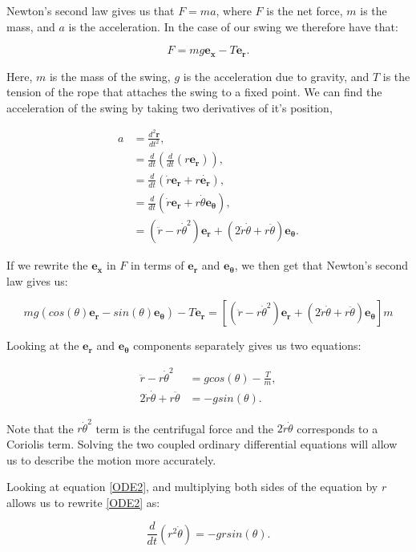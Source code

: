 \documentclass[12pt]{article}
\begin{document}
Newton's second law gives us that $F = ma$, where $F$ is the net force, $m$ is the mass, and $a$ is the acceleration. In the case of our swing we therefore have that:

$$F = m g \mathbf{e_x} - T \mathbf{e_r}.$$

Here, $m$ is the mass of the swing, $g$ is the acceleration due to gravity, and $T$ is the tension of the rope that attaches the swing to a fixed point. We can find the acceleration of the swing by taking two derivatives of it's position,

\begin{align}
    a &= \frac{d^2\mathbf{r}}{dt^2},\\
    &= \frac{d}{dt}(\frac{d}{dt}(r\mathbf{e_r})),\\
    &= \frac{d}{dt}(\dot{r} \mathbf{e_r} + r\mathbf{\dot{e_r}}),\\
    &= \frac{d}{dt}(\dot{r} \mathbf{e_r} + r\dot{\theta}\mathbf{e_\theta}),\\
    &= (\ddot{r} - r \dot{\theta}^2) \mathbf{e_r} + (2\dot{r} \dot{\theta} + r \ddot{\theta}) \mathbf{e_\theta}.
\end{align}

If we rewrite the $\mathbf{e_x}$ in $F$ in terms of $\mathbf{e_r}$ and $\mathbf{e_\theta}$, we then get that Newton's second law gives us:

$$mg(cos(\theta) \mathbf{e_r} - sin(\theta) \mathbf{e_\theta}) - T\mathbf{e_r} = [(\ddot{r} - r \dot{\theta}^2) \mathbf{e_r} + (2\dot{r} \dot{\theta} + r \ddot{\theta}) \mathbf{e_\theta}]m$$

Looking at the $\mathbf{e_r}$ and $\mathbf{e_\theta}$ components separately gives us two equations:

\begin{align}
    \ddot{r} - r \dot{\theta}^2 &= gcos(\theta) - \frac{T}{m},\label{ODE1}\\
    2\dot{r} \dot{\theta} + r \ddot{\theta} &= -gsin(\theta).\label{ODE2}
\end{align}

Note that the $r \dot{\theta}^2$ term is the centrifugal force and the $2 \dot{r}\dot{\theta}$ corresponds to a Coriolis term.  Solving the two coupled ordinary differential equations will allow us to describe the motion more accurately.



Looking at equation \ref{ODE2}, and multiplying both sides of the equation by $r$ allows us to rewrite \ref{ODE2} as:

$$\frac{d}{dt}(r^2 \dot{\theta}) = -grsin(\theta).$$
\end{document}
